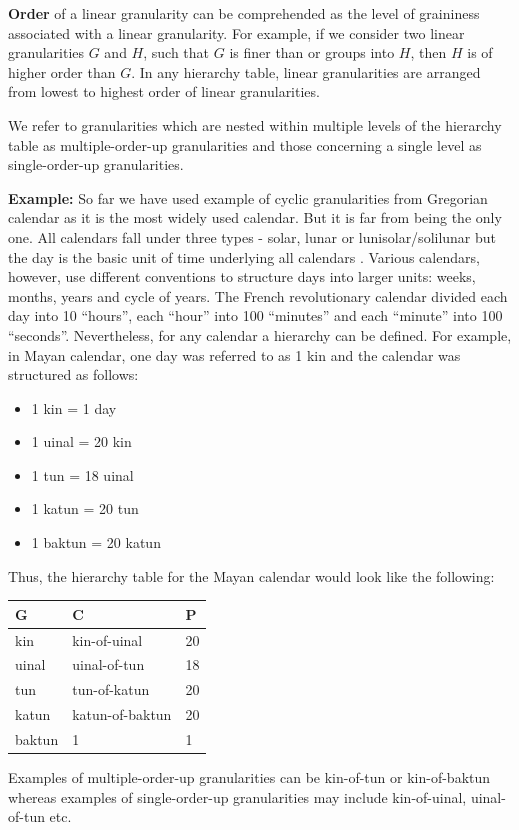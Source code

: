 \documentclass[12pt]{article}
\providecommand{\tightlist}{%
  \setlength{\itemsep}{0pt}\setlength{\parskip}{0pt}}
\begin{document}
\textbf{Order} of a linear granularity can be comprehended as the level of graininess associated with a linear granularity. For example, if we consider two linear granularities \(G\) and \(H\), such that \(G\) is finer than or groups into \(H\), then \(H\) is of higher order than \(G\). In any hierarchy table, linear granularities are arranged from lowest to highest order of linear granularities.

We refer to granularities which are nested within multiple levels of the hierarchy table as multiple-order-up granularities and those concerning a single level as single-order-up granularities.

\textbf{Example:} So far we have used example of cyclic granularities from Gregorian calendar as it is the most widely used calendar. But it is far from being the only one. All calendars fall under three types - solar, lunar or lunisolar/solilunar but the day is the basic unit of time underlying all calendars \citep{Reingold2001-kf}. Various calendars, however, use different conventions to structure days into larger units: weeks, months, years and cycle of years. The French revolutionary calendar divided each day into 10 ``hours'', each ``hour'' into 100 ``minutes'' and each ``minute'' into 100 ``seconds''. Nevertheless, for any calendar a hierarchy can be defined. For example, in Mayan calendar, one day was referred to as 1 kin and the calendar was structured as follows:

\begin{itemize}
\tightlist
\item
  1 kin = 1 day
\item
  1 uinal = 20 kin
\item
  1 tun = 18 uinal
\item
  1 katun = 20 tun
\item
  1 baktun = 20 katun
\end{itemize}

Thus, the hierarchy table for the Mayan calendar would look like the following:

\begin{longtable}[]{@{}lll@{}}
\toprule
G & C & P\tabularnewline
\midrule
\endhead
kin & kin-of-uinal & 20\tabularnewline
uinal & uinal-of-tun & 18\tabularnewline
tun & tun-of-katun & 20\tabularnewline
katun & katun-of-baktun & 20\tabularnewline
baktun & 1 & 1\tabularnewline
\bottomrule
\end{longtable}

Examples of multiple-order-up granularities can be kin-of-tun or kin-of-baktun whereas examples of single-order-up granularities may include kin-of-uinal, uinal-of-tun etc.
\end{document}
